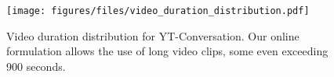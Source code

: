 


\begin{figure}[t]
\centering
\texttt{[image: figures/files/video\_duration\_distribution.pdf]}
\caption{Video duration distribution for YT-Conversation. Our online formulation allows the use of long video clips, some even exceeding 900 seconds.}
\label{fig:fig5_YT_video_dist}
\vspace*{-1.0em}
\end{figure}


